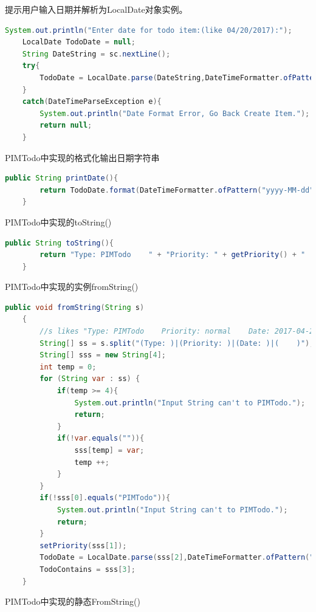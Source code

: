 \documentclass[a4paper]{article}
\begin{document}
提示用户输入日期并解析为LocalDate对象实例。

\begin{lstlisting}[language=Java]
    System.out.println("Enter date for todo item:(like 04/20/2017):");
    LocalDate TodoDate = null;
    String DateString = sc.nextLine();
    try{
        TodoDate = LocalDate.parse(DateString,DateTimeFormatter.ofPattern("MM/dd/yyyy"));
    }
    catch(DateTimeParseException e){
        System.out.println("Date Format Error, Go Back Create Item.");
        return null;
    }
\end{lstlisting}

PIMTodo中实现的格式化输出日期字符串

\begin{lstlisting}[language=Java]
    public String printDate(){
        return TodoDate.format(DateTimeFormatter.ofPattern("yyyy-MM-dd"));
    }
\end{lstlisting}

PIMTodo中实现的toString()

\begin{lstlisting}[language=Java]
    public String toString(){
        return "Type: PIMTodo    " + "Priority: " + getPriority() + "    Date: " + printDate() + "    " + TodoContains;
    }
\end{lstlisting}

PIMTodo中实现的实例fromString()

\begin{lstlisting}[language=Java]
    public void fromString(String s)
    {
        //s likes "Type: PIMTodo    Priority: normal    Date: 2017-04-20    text""
        String[] ss = s.split("(Type: )|(Priority: )|(Date: )|(    )");
        String[] sss = new String[4];
        int temp = 0;
        for (String var : ss) {
            if(temp >= 4){
                System.out.println("Input String can't to PIMTodo.");
                return;
            }
            if(!var.equals("")){
                sss[temp] = var;
                temp ++;
            }
        }
        if(!sss[0].equals("PIMTodo")){
            System.out.println("Input String can't to PIMTodo.");
            return;
        }
        setPriority(sss[1]);
        TodoDate = LocalDate.parse(sss[2],DateTimeFormatter.ofPattern("yyyy-MM-dd"));
        TodoContains = sss[3];
    }
\end{lstlisting}

PIMTodo中实现的静态FromString()
\end{document}
